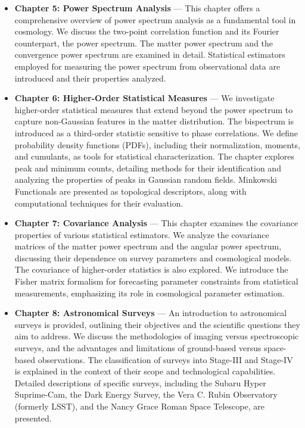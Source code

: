 \begin{itemize}
    \item \textbf{Chapter 5: Power Spectrum Analysis} --- This chapter offers a comprehensive overview of power spectrum analysis as a fundamental tool in cosmology. We discuss the two-point correlation function and its Fourier counterpart, the power spectrum. The matter power spectrum and the convergence power spectrum are examined in detail. Statistical estimators employed for measuring the power spectrum from observational data are introduced and their properties analyzed.

    \item \textbf{Chapter 6: Higher-Order Statistical Measures} --- We investigate higher-order statistical measures that extend beyond the power spectrum to capture non-Gaussian features in the matter distribution. The bispectrum is introduced as a third-order statistic sensitive to phase correlations. We define probability density functions (PDFs), including their normalization, moments, and cumulants, as tools for statistical characterization. The chapter explores peak and minimum counts, detailing methods for their identification and analyzing the properties of peaks in Gaussian random fields. Minkowski Functionals are presented as topological descriptors, along with computational techniques for their evaluation.

    \item \textbf{Chapter 7: Covariance Analysis} --- This chapter examines the covariance properties of various statistical estimators. We analyze the covariance matrices of the matter power spectrum and the angular power spectrum, discussing their dependence on survey parameters and cosmological models. The covariance of higher-order statistics is also explored. We introduce the Fisher matrix formalism for forecasting parameter constraints from statistical measurements, emphasizing its role in cosmological parameter estimation.

    \item \textbf{Chapter 8: Astronomical Surveys} --- An introduction to astronomical surveys is provided, outlining their objectives and the scientific questions they aim to address. We discuss the methodologies of imaging versus spectroscopic surveys, and the advantages and limitations of ground-based versus space-based observations. The classification of surveys into Stage-III and Stage-IV is explained in the context of their scope and technological capabilities. Detailed descriptions of specific surveys, including the Subaru Hyper Suprime-Cam, the Dark Energy Survey, the Vera C. Rubin Observatory (formerly LSST), and the Nancy Grace Roman Space Telescope, are presented.


\end{itemize}

